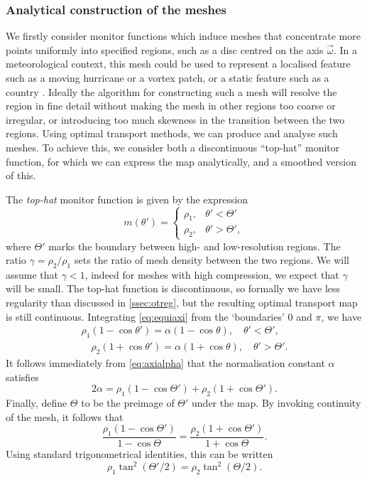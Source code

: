 \documentclass[11pt, a4paper]{scrartcl}  %
\theoremstyle{plain}
\theoremstyle{definition}
\numberwithin{equation}{section}
\begin{document}
\subsubsection{Analytical construction of the meshes}

We firstly consider monitor functions which induce meshes that
concentrate more points uniformly into specified regions, such as a disc
centred on the axis $\vec{\omega}$. In a meteorological context, this
mesh could be used to represent a localised feature such as a moving
hurricane or a vortex patch, or a static feature such as a country
\citep{ringler2011exploring}. Ideally the algorithm for constructing such
a mesh will resolve the region in fine detail without making the mesh
in other regions too coarse or irregular, or introducing too much
skewness in the transition between the two regions. Using optimal
transport methods, we can produce and analyse such meshes. To achieve
this, we consider both a discontinuous ``top-hat'' monitor function, for
which we can express the map analytically, and a smoothed version of
this.

The \emph{top-hat} monitor function is given by the expression
\begin{equation}
\label{eq:mtophat}
m(\theta') =
\begin{cases}
\rho_1, &\theta' < \Theta'\\
\rho_2, &\theta' > \Theta',
\end{cases}
\end{equation}
where $\Theta'$ marks the boundary between high- and low-resolution
regions. The ratio $\gamma = \rho_2/\rho_1$ sets the ratio of mesh
density between the two regions. We will assume that $\gamma < 1$,
indeed for meshes with high compression, we expect that $\gamma$ will be
small. The top-hat function is discontinuous, so formally we have less
regularity than discussed in \cref{ssec:otreg}, but the resulting
optimal transport map is still continuous. Integrating \cref{eq:equiaxi}
from the `boundaries' 0 and $\pi$, we have
\begin{align}
\label{eq:tophatreg1}
\rho_1 (1 - \cos\theta') = \alpha (1 - \cos\theta), \quad \theta' < \Theta', \\
\label{eq:tophatreg2}
\quad \rho_2 (1 + \cos\theta') = \alpha (1 + \cos\theta), \quad \theta' > \Theta'.
\end{align}
It follows immediately from \cref{eq:axialpha} that the normalisation
constant $\alpha$ satisfies
\begin{equation}
2 \alpha = \rho_1 (1 - \cos\Theta') + \rho_2 (1 + \cos\Theta').
\end{equation}
Finally, define $\Theta$ to be the preimage of $\Theta'$ under the map.
By invoking continuity of the mesh, it follows that
\begin{equation}
\frac{\rho_1 (1 - \cos\Theta')}{1 - \cos\Theta} = \frac{\rho_2 (1 + \cos\Theta')}{1 + \cos\Theta}.
\end{equation}
Using standard trigonometrical identities, this can be written
\begin{equation}
\label{eq:tophatbdry}
\rho_1 \tan^2(\Theta'/2) = \rho_2 \tan^2(\Theta/2).
\end{equation}
\end{document}
